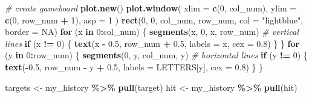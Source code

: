 \documentclass[
]{article}
\newenvironment{Shaded}{\begin{snugshade}}{\end{snugshade}}
\newcommand{\AttributeTok}[1]{\textcolor[rgb]{0.13,0.29,0.53}{#1}}
\newcommand{\CommentTok}[1]{\textcolor[rgb]{0.56,0.35,0.01}{\textit{#1}}}
\newcommand{\ConstantTok}[1]{\textcolor[rgb]{0.56,0.35,0.01}{#1}}
\newcommand{\ControlFlowTok}[1]{\textcolor[rgb]{0.13,0.29,0.53}{\textbf{#1}}}
\newcommand{\DecValTok}[1]{\textcolor[rgb]{0.00,0.00,0.81}{#1}}
\newcommand{\FloatTok}[1]{\textcolor[rgb]{0.00,0.00,0.81}{#1}}
\newcommand{\FunctionTok}[1]{\textcolor[rgb]{0.13,0.29,0.53}{\textbf{#1}}}
\newcommand{\NormalTok}[1]{#1}
\newcommand{\OtherTok}[1]{\textcolor[rgb]{0.56,0.35,0.01}{#1}}
\newcommand{\SpecialCharTok}[1]{\textcolor[rgb]{0.81,0.36,0.00}{\textbf{#1}}}
\newcommand{\StringTok}[1]{\textcolor[rgb]{0.31,0.60,0.02}{#1}}
\begin{document}
\begin{Shaded}
\begin{Highlighting}[]
    \CommentTok{\# create gameboard}
    \FunctionTok{plot.new}\NormalTok{()}
    \FunctionTok{plot.window}\NormalTok{(}
      \AttributeTok{xlim =} \FunctionTok{c}\NormalTok{(}\DecValTok{0}\NormalTok{, col\_num),}
      \AttributeTok{ylim =} \FunctionTok{c}\NormalTok{(}\DecValTok{0}\NormalTok{, row\_num }\SpecialCharTok{+} \DecValTok{1}\NormalTok{),}
      \AttributeTok{asp =} \DecValTok{1}
\NormalTok{    )}
    \FunctionTok{rect}\NormalTok{(}\DecValTok{0}\NormalTok{, }\DecValTok{0}\NormalTok{, col\_num, row\_num, }\AttributeTok{col =} \StringTok{"lightblue"}\NormalTok{, }\AttributeTok{border =} \ConstantTok{NA}\NormalTok{)}
    \ControlFlowTok{for}\NormalTok{ (x }\ControlFlowTok{in} \DecValTok{0}\SpecialCharTok{:}\NormalTok{col\_num) \{}
      \FunctionTok{segments}\NormalTok{(x, }\DecValTok{0}\NormalTok{, x, row\_num) }\CommentTok{\# vertical lines}
      \ControlFlowTok{if}\NormalTok{ (x }\SpecialCharTok{!=} \DecValTok{0}\NormalTok{) \{}
        \FunctionTok{text}\NormalTok{(x }\SpecialCharTok{{-}} \FloatTok{0.5}\NormalTok{, row\_num }\SpecialCharTok{+} \FloatTok{0.5}\NormalTok{, }\AttributeTok{labels =}\NormalTok{ x, }\AttributeTok{cex =} \FloatTok{0.8}\NormalTok{)}
\NormalTok{      \}}
\NormalTok{    \}}
    \ControlFlowTok{for}\NormalTok{ (y }\ControlFlowTok{in} \DecValTok{0}\SpecialCharTok{:}\NormalTok{row\_num) \{}
      \FunctionTok{segments}\NormalTok{(}\DecValTok{0}\NormalTok{, y, col\_num, y) }\CommentTok{\# horizontal lines}
      \ControlFlowTok{if}\NormalTok{ (y }\SpecialCharTok{!=} \DecValTok{0}\NormalTok{) \{}
        \FunctionTok{text}\NormalTok{(}\SpecialCharTok{{-}}\FloatTok{0.5}\NormalTok{, row\_num }\SpecialCharTok{{-}}\NormalTok{ y }\SpecialCharTok{+} \FloatTok{0.5}\NormalTok{, }\AttributeTok{labels =}\NormalTok{ LETTERS[y], }\AttributeTok{cex =} \FloatTok{0.8}\NormalTok{)}
\NormalTok{      \}}
\NormalTok{    \}}
    
\NormalTok{    targets }\OtherTok{\textless{}{-}}\NormalTok{ my\_history }\SpecialCharTok{\%\textgreater{}\%} \FunctionTok{pull}\NormalTok{(target)}
\NormalTok{    hit }\OtherTok{\textless{}{-}}\NormalTok{ my\_history }\SpecialCharTok{\%\textgreater{}\%} \FunctionTok{pull}\NormalTok{(hit)}
    

\end{Highlighting}
\end{Shaded}
\end{document}
